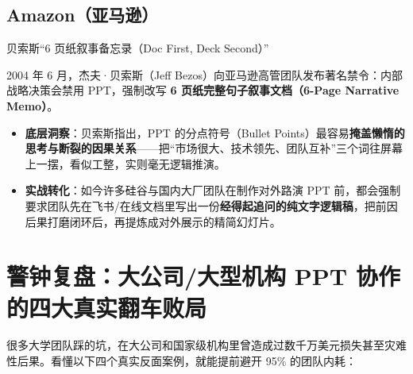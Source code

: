 \documentclass[UTF8,a4paper,11pt,fontset=none]{ctexart}
\newcommand{\tagline}[1]{{\sffamily\small\color{muted}#1\par}\vspace{0.18em}}
\newcommand{\secstart}[1]{\needspace{5.2\baselineskip}\section{#1}}
\newcommand{\substart}[1]{\needspace{4.2\baselineskip}\subsection{#1}}
\begin{document}
\substart{Amazon（亚马逊）}
\tagline{贝索斯“6 页纸叙事备忘录（Doc First, Deck Second）”}

2004 年 6 月，杰夫·贝索斯（Jeff Bezos）向亚马逊高管团队发布著名禁令：内部战略决策会禁用 PPT，强制改写 \textbf{6 页纸完整句子叙事文档（6-Page Narrative Memo）}。

\begin{itemize}
\item \textbf{底层洞察}：贝索斯指出，PPT 的分点符号（Bullet Points）最容易\textbf{掩盖懒惰的思考与断裂的因果关系}——把“市场很大、技术领先、团队互补”三个词往屏幕上一摆，看似工整，实则毫无逻辑推演。
\item \textbf{实战转化}：如今许多硅谷与国内大厂团队在制作对外路演 PPT 前，都会强制要求团队先在飞书/在线文档里写出一份\textbf{经得起追问的纯文字逻辑稿}，把前因后果打磨闭环后，再提炼成对外展示的精简幻灯片。
\end{itemize}

\secstart{警钟复盘：大公司/大型机构 PPT 协作的四大真实翻车败局}

很多大学团队踩的坑，在大公司和国家级机构里曾造成过数千万美元损失甚至灾难性后果。看懂以下四个真实反面案例，就能提前避开 95\% 的团队内耗：

\vspace{3pt}
\end{document}
